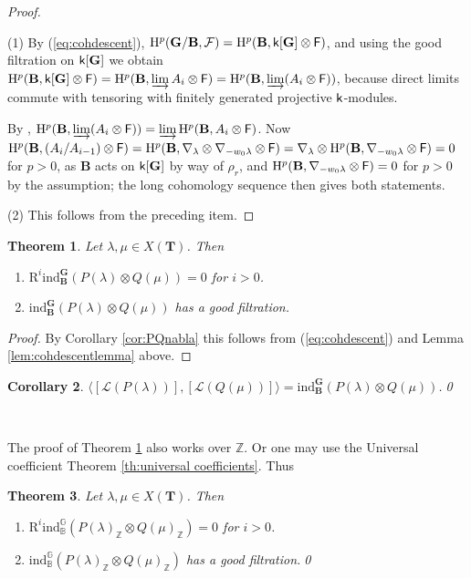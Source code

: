\documentclass[sn-mathphys-num]{sn-jnl}%
\newcommand{\Ff}{\mathcal F}
\newcommand{\Ll}{\mathcal L}
\newcommand{\RR}{\mathrm R}
\newcommand{\ind}{{\mathrm{ind}}}
\newcommand{\sk}{{\sf k}}
\newcommand{\Gm}{\mathbb G}
\newcommand{\Bm}{\mathbb B}
\newcommand{\Z}{{\mathbb Z}}
\newcommand{\bg}{\mathbf G}
\newcommand{\fb}{\mathbf B}
\newcommand{\bt}{\mathbf T}
\newtheorem{theorem}{Theorem}[section]
\newtheorem{corollary}[theorem]{Corollary}
\theoremstyle{definition}
\begin{document}
\begin{proof}
\

(1) By (\ref{eq:cohdescent}), ${\rm H}^{p}({ \bg/\fb},\Ff)={\rm H}^p({\fb},\sk[{ \bg}]\otimes {\sf F})$, 
and using the good filtration on $\sk[ \bg]$ we obtain 
${\rm H}^p({\fb},\sk[{ \bg}]\otimes {\sf F})={\rm H}^p({\fb},\varinjlim A_i\otimes {\sf F})={\rm H}^p({\fb},\varinjlim (A_i\otimes {\sf F}))$, 
because direct limits commute with tensoring with finitely generated projective $\sk$-modules. 

By \cite[I. Lemma 4.17]{Jan}, ${\rm H}^p({\fb},\varinjlim (A_i\otimes {\sf F}))=\varinjlim{\rm H}^p({\fb}, A_i\otimes {\sf F})$. 
Now ${\rm H}^p({\fb}, (A_i/A_{i-1})\otimes {\sf F})={\rm H}^p({\fb},\nabla _{\lambda}\otimes \nabla _{-w_0\lambda}\otimes {\sf F})=\nabla _{\lambda}\otimes {\rm H}^p({\fb},\nabla _{-w_0\lambda}\otimes {\sf F})=0$ for $p>0$, as ${\fb}$ acts on $\sk[ \bg]$ 
by way of $\rho _r$, and ${\rm H}^p({\fb},\nabla _{-w_0\lambda}\otimes {\sf F})=0$ for $p>0$ by the assumption; the long cohomology sequence then gives both statements.
 
 
 
(2) This follows from the preceding item.
\end{proof}

\begin{theorem}\label{th:highInd}
Let $\lambda,\mu\in X( \bt)$. Then
\begin{enumerate}
\item $\RR^i\ind_{\fb}^ \bg (P(\lambda)\otimes Q(\mu))=0$ for $i>0$.
\item $\ind_{\fb}^ \bg (P(\lambda)\otimes Q(\mu))$ has a good filtration.
\end{enumerate}
\end{theorem}
\begin{proof}
By Corollary \ref{cor:PQnabla} this follows from (\ref{eq:cohdescent}) and Lemma \ref{lem:cohdescentlemma} above.
\end{proof}

\begin{corollary}\label{cor:P-Q_pairing}
 $\langle[\Ll(P(\lambda))],[\Ll(Q(\mu))]\rangle=\ind_{\fb}^ \bg (P(\lambda)\otimes Q(\mu))$.\qed
\end{corollary}

\

The proof of Theorem \ref{th:highInd} also works over $\Z$. Or one may use the Universal 
coefficient Theorem \ref{th:universal coefficients}. Thus

\begin{theorem}\label{th:highIndZ}
Let $\lambda,\mu\in X( \bt)$.
Then
\begin{enumerate}
\item $\RR^i\ind_{\Bm}^{\Gm} (P(\lambda)_\Z\otimes Q(\mu)_\Z)=0$ for $i>0$.
\item $\ind_{\Bm}^{\Gm} (P(\lambda)_\Z\otimes Q(\mu)_\Z)$  has a good filtration.\qed
\end{enumerate}
\end{theorem}
\end{document}
